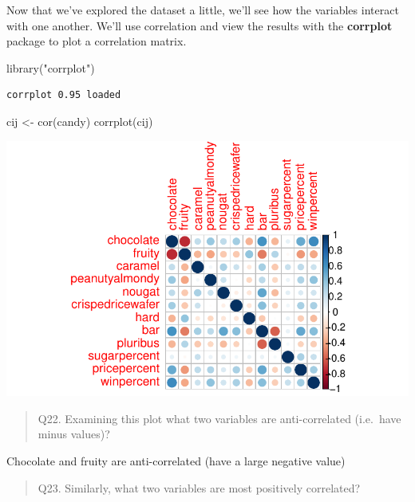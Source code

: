 \documentclass[
  letterpaper,
  DIV=11,
  numbers=noendperiod]{scrartcl}
\newenvironment{Shaded}{\begin{snugshade}}{\end{snugshade}}
\newcommand{\FunctionTok}[1]{\textcolor[rgb]{0.28,0.35,0.67}{#1}}
\newcommand{\NormalTok}[1]{\textcolor[rgb]{0.00,0.23,0.31}{#1}}
\newcommand{\OtherTok}[1]{\textcolor[rgb]{0.00,0.23,0.31}{#1}}
\newcommand{\StringTok}[1]{\textcolor[rgb]{0.13,0.47,0.30}{#1}}
\begin{document}
Now that we've explored the dataset a little, we'll see how the
variables interact with one another. We'll use correlation and view the
results with the \textbf{corrplot} package to plot a correlation matrix.

\begin{Shaded}
\begin{Highlighting}[]
\FunctionTok{library}\NormalTok{(}\StringTok{"corrplot"}\NormalTok{)}
\end{Highlighting}
\end{Shaded}

\begin{verbatim}
corrplot 0.95 loaded
\end{verbatim}

\begin{Shaded}
\begin{Highlighting}[]
\NormalTok{cij }\OtherTok{\textless{}{-}} \FunctionTok{cor}\NormalTok{(candy)}
\FunctionTok{corrplot}\NormalTok{(cij)}
\end{Highlighting}
\end{Shaded}

\includegraphics{Class09_files/figure-pdf/unnamed-chunk-20-1.pdf}

\begin{quote}
Q22. Examining this plot what two variables are anti-correlated
(i.e.~have minus values)?
\end{quote}

Chocolate and fruity are anti-correlated (have a large negative value)

\begin{quote}
Q23. Similarly, what two variables are most positively correlated?
\end{quote}
\end{document}
